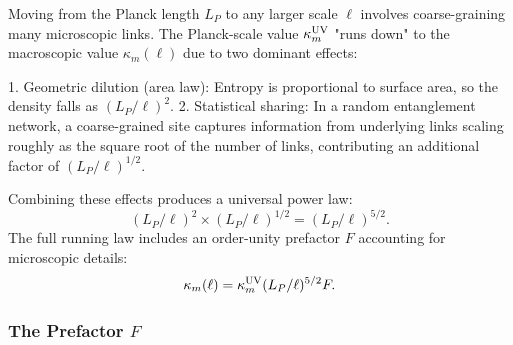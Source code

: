 \documentclass[11pt]{article}
\begin{document}
Moving from the Planck length $L_P$ to any larger scale $\ell$ involves coarse-graining many microscopic links. The Planck-scale value $\kappa_m^{\rm UV}$ "runs down" to the macroscopic value $\kappa_m(\ell)$ due to two dominant effects:

1.  Geometric dilution (area law): Entropy is proportional to surface area, so the density falls as $(L_P / \ell)^2$.
2.  Statistical sharing: In a random entanglement network, a coarse-grained site captures information from underlying links scaling roughly as the square root of the number of links, contributing an additional factor of $(L_P / \ell)^{1/2}$.

Combining these effects produces a universal power law:
$$ (L_P / \ell)^2 \times (L_P / \ell)^{1/2} = (L_P / \ell)^{5/2}. $$
The full running law includes an order-unity prefactor $F$ accounting for microscopic details:
$$ \kappa_m(\ell) = \kappa_m^{\rm UV} (L_P / \ell)^{5/2} F. $$

\subsubsection{The Prefactor $F$}
\end{document}
